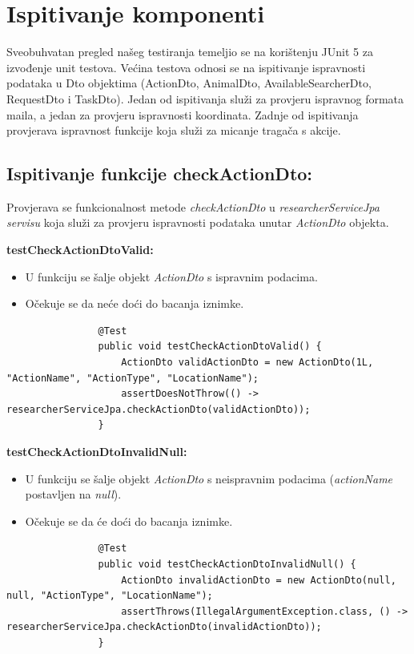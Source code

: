 			\section{Ispitivanje komponenti}
			
			Sveobuhvatan pregled našeg testiranja temeljio se na korištenju JUnit 5 za izvođenje unit testova. Većina testova odnosi se na ispitivanje ispravnosti podataka u Dto objektima (ActionDto, AnimalDto, AvailableSearcherDto, RequestDto i TaskDto). Jedan od ispitivanja služi za provjeru ispravnog formata maila, a jedan za provjeru ispravnosti koordinata. Zadnje od ispitivanja provjerava ispravnost funkcije koja služi za micanje tragača s akcije.
			
			\subsection{Ispitivanje funkcije checkActionDto:}
			Provjerava se funkcionalnost metode \textit{checkActionDto} u \textit{researcherServiceJpa servisu} koja služi za provjeru ispravnosti podataka unutar \textit{ActionDto} objekta.
			
			\textbf{testCheckActionDtoValid:}
			\begin{itemize}
				\item U funkciju se šalje objekt \textit{ActionDto} s ispravnim podacima.
				\item Očekuje se da neće doći do bacanja iznimke.
			\end{itemize}
			\begin{lstlisting}
				@Test
				public void testCheckActionDtoValid() {
					ActionDto validActionDto = new ActionDto(1L, "ActionName", "ActionType", "LocationName");
					assertDoesNotThrow(() -> researcherServiceJpa.checkActionDto(validActionDto));
				}
			\end{lstlisting}
			
			\textbf{testCheckActionDtoInvalidNull:}
			\begin{itemize}
				\item U funkciju se šalje objekt \textit{ActionDto} s neispravnim podacima (\textit{actionName} postavljen na \textit{null}).
				\item Očekuje se da će doći do bacanja iznimke.
			\end{itemize}
			\begin{lstlisting}
				@Test
				public void testCheckActionDtoInvalidNull() {
					ActionDto invalidActionDto = new ActionDto(null, null, "ActionType", "LocationName");
					assertThrows(IllegalArgumentException.class, () -> researcherServiceJpa.checkActionDto(invalidActionDto));
				}
			\end{lstlisting}
			
